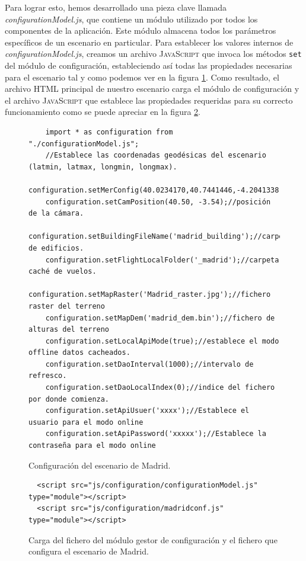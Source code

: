 \documentclass[a4paper, 11pt]{book}
\begin{document}
Para lograr esto, hemos desarrollado una pieza clave llamada \emph{configurationModel.js}, que contiene un módulo utilizado por todos los componentes de la aplicación. Este módulo almacena todos los parámetros específicos de un escenario en particular. Para establecer los valores internos de \emph{configurationModel.js}, creamos un archivo \textsc{JavaScript} que invoca los métodos \texttt{set} del módulo de configuración, estableciendo así todas las propiedades necesarias para el escenario tal y como podemos ver en la figura \ref{codigo:madridConf}. 
Como resultado, el archivo \textsc{HTML} principal de nuestro escenario carga el módulo de configuración y el archivo \textsc{JavaScript} que establece las propiedades requeridas para su correcto funcionamiento como se puede apreciar en la figura \ref{codigo:cargaConfiguracion}.
\begin{figure}[h]
\centering
\begin{verbatim}
    import * as configuration from "./configurationModel.js";
    //Establece las coordenadas geodésicas del escenario (latmin, latmax, longmin, longmax).
    configuration.setMerConfig(40.0234170,40.7441446,-4.2041338,-3.2538165);
    configuration.setCamPosition(40.50, -3.54);//posición de la cámara.
    configuration.setBuildingFileName('madrid_building');//carpeta de edificios.
    configuration.setFlightLocalFolder('_madrid');//carpeta caché de vuelos.
    configuration.setMapRaster('Madrid_raster.jpg');//fichero raster del terreno
    configuration.setMapDem('madrid_dem.bin');//fichero de alturas del terreno
    configuration.setLocalApiMode(true);//establece el modo offline datos cacheados.
    configuration.setDaoInterval(1000);//intervalo de refresco.
    configuration.setDaoLocalIndex(0);//indice del fichero por donde comienza.
    configuration.setApiUsuer('xxxx');//Establece el usuario para el modo online
    configuration.setApiPassword('xxxxx');//Establece la contraseña para el modo online
\end{verbatim}
\caption{Configuración del escenario de Madrid.
\label{codigo:madridConf}}
\end{figure}
\begin{figure}[h]
\centering
\begin{verbatim}
  <script src="js/configuration/configurationModel.js" type="module"></script>
  <script src="js/configuration/madridconf.js" type="module"></script>
\end{verbatim}
\caption{Carga del fichero del módulo gestor de configuración y el fichero que configura el escenario de Madrid.
\label{codigo:cargaConfiguracion}}
\end{figure}
\end{document}
